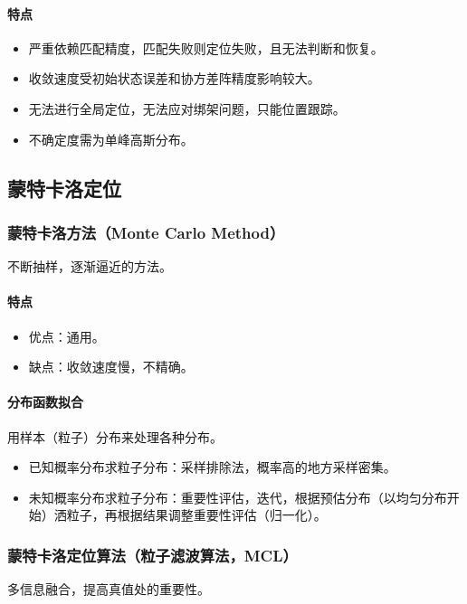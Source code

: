 \documentclass[
12pt, %
a4paper, 
oneside, %
headinclude,footinclude, %
]{scrartcl}
\begin{document}
\paragraph{特点}
\begin{itemize}
\item 严重依赖匹配精度，匹配失败则定位失败，且无法判断和恢复。
\item 收敛速度受初始状态误差和协方差阵精度影响较大。
\item 无法进行全局定位，无法应对绑架问题，只能位置跟踪。
\item 不确定度需为单峰高斯分布。
\end{itemize}
\subsection[蒙特卡洛定位]{蒙特卡洛定位}
\subsubsection[蒙特卡洛方法]{蒙特卡洛方法（Monte Carlo Method）}
不断抽样，逐渐逼近的方法。
\paragraph{特点}
\begin{itemize}
\item 优点：通用。
\item 缺点：收敛速度慢，不精确。
\end{itemize}
\paragraph{分布函数拟合}
用样本（粒子）分布来处理各种分布。
\begin{itemize}
\item 已知概率分布求粒子分布：采样排除法，概率高的地方采样密集。
\item 未知概率分布求粒子分布：重要性评估，迭代，根据预估分布（以均匀分布开始）洒粒子，再根据结果调整重要性评估（归一化）。
\end{itemize}
\subsubsection[蒙特卡洛定位算法（粒子滤波算法）]{蒙特卡洛定位算法（粒子滤波算法，MCL）}
多信息融合，提高真值处的重要性。
\end{document}
